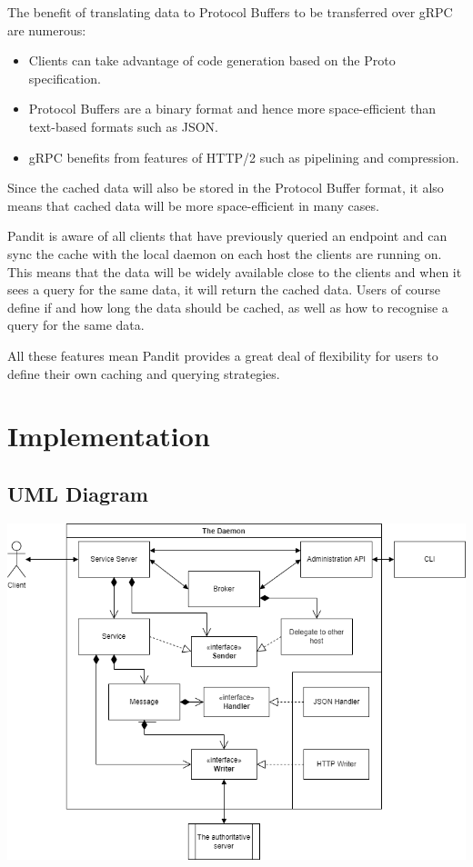 \documentclass[a4paper,12pt]{report}
\begin{document}
The benefit of translating data to Protocol Buffers to be transferred over gRPC are numerous:
\begin{itemize}
    \item Clients can take advantage of code generation based on the Proto specification. \cite{codegen}
    \item Protocol Buffers are a binary format and hence more space-efficient than text-based formats such as JSON. \cite{encoding}
    \item gRPC benefits from features of HTTP/2 such as pipelining and compression. \cite{http2}
\end{itemize}

Since the cached data will also be stored in the Protocol Buffer format, it also means that cached data will be more space-efficient in
many cases.

Pandit is aware of all clients that have previously queried an endpoint and can sync the cache with the local daemon on each host the
clients are running on.
This means that the data will be widely available close to the clients and when it sees a query for the same data, it will return the cached data.
Users of course define if and how long the data should be cached, as well as how to recognise a query for the same data.

All these features mean Pandit provides a great deal of flexibility for users to define their own caching and querying strategies.

\section{Implementation}
\subsection{UML Diagram}
\includegraphics[scale=0.45]{uml}
\end{document}
